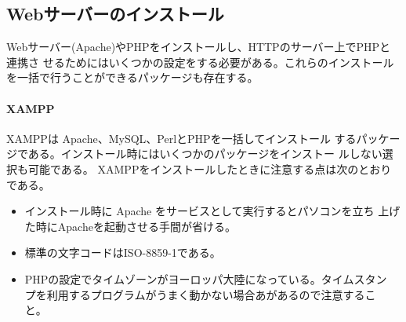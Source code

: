 \subsection{Webサーバーのインストール}
Webサーバー(Apache)やPHPをインストールし、HTTPのサーバー上でPHPと連携さ
せるためにはいくつかの設定をする必要がある。これらのインストール
を一括で行うことができるパッケージも存在する。
\paragraph{XAMPP}XAMPPは Apache、MySQL、PerlとPHPを一括してインストール
するパッケージである。インストール時にはいくつかのパッケージをインストー
ルしない選択も可能である。%
XAMPPをインストールしたときに注意する点は次のとおりである。
\begin{itemize}
 \item インストール時に Apache をサービスとして実行するとパソコンを立ち
       上げた時にApacheを起動させる手間が省ける。
 \item 標準の文字コードはISO-8859-1である。
 \item PHPの設定でタイムゾーンがヨーロッパ大陸になっている。タイムスタン
       プを利用するプログラムがうまく動かない場合あがあるので注意するこ
       と。
\end{itemize}





